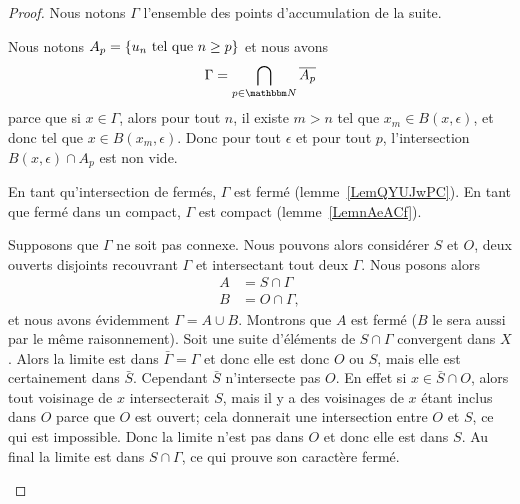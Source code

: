 \begin{proof}
    Nous notons \( \Gamma\) l'ensemble des points d'accumulation de la suite.
    \begin{subproof}
    \item[\( \Gamma\) est compact]
        Nous notons \( A_p=\{ u_n\text{ tel que } n\geq p \}\) et nous avons
        \begin{equation}
            \Gamma=\bigcap_{p\in \eN}\overline{ A_p }
        \end{equation}
        parce que si \( x\in\Gamma\), alors pour tout \( n\), il existe \( m>n\) tel que \( x_m\in B(x,\epsilon)\), et donc tel que \( x\in B(x_m,\epsilon)\). Donc pour tout \( \epsilon\) et pour tout \( p\), l'intersection \( B(x,\epsilon)\cap A_p\) est non vide.

        En tant qu'intersection de fermés, \( \Gamma\) est fermé (lemme~\ref{LemQYUJwPC}). En tant que fermé dans un compact, \( \Gamma\) est compact (lemme~\ref{LemnAeACf}).

    \item[Recouvrement par deux compacts]

        Supposons que \( \Gamma\) ne soit pas connexe. Nous pouvons alors considérer \( S\) et \( O\), deux ouverts disjoints recouvrant \( \Gamma\) et intersectant tout deux \( \Gamma\). Nous posons alors
        \begin{subequations}
            \begin{align}
                A&=S\cap\Gamma\\
                B&=O\cap\Gamma,
            \end{align}
        \end{subequations}
        et nous avons évidemment \( \Gamma=A\cup B\). Montrons que \( A\) est fermé (\( B\) le sera aussi par le même raisonnement). Soit une suite d'éléments de \( S\cap \Gamma\) convergent dans \( X\). Alors la limite est dans \( \bar\Gamma=\Gamma\) et donc elle est donc \( O\) ou \( S\), mais elle est certainement dans \( \bar S\). Cependant \( \bar S\) n'intersecte pas \( O\). En effet si \( x\in \bar S\cap O\), alors tout voisinage de \( x\) intersecterait \( S\), mais il y a des voisinages de \( x\) étant inclus dans \( O\) parce que \( O\) est ouvert; cela donnerait une intersection entre \( O\) et \( S\), ce qui est impossible. Donc la limite n'est pas dans \( O\) et donc elle est dans \( S\). Au final la limite est dans \( S\cap \Gamma\), ce qui prouve son caractère fermé.


\end{subproof}
\end{proof}
